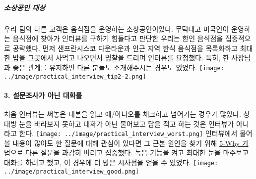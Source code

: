 \documentclass[
  letterpaper,
  DIV=11,
  numbers=noendperiod]{scrartcl}
\let\oldparagraph\paragraph
\renewcommand{\paragraph}[1]{\oldparagraph{#1}\mbox{}}
\let\oldsubparagraph\subparagraph
\renewcommand{\subparagraph}[1]{\oldsubparagraph{#1}\mbox{}}
\begin{document}
\hypertarget{uxc18cuxc0c1uxacf5uxc778-uxb300uxc0c1}{%
\subparagraph{소상공인
대상}\label{uxc18cuxc0c1uxacf5uxc778-uxb300uxc0c1}}

우리 팀의 다른 고객은 음식점을 운영하는 소상공인이었다. 무턱대고
미국인이 운영하는 음식점에 찾아가 인터뷰를 구하기 힘들다고 판단한 우리는
한인 음식점을 집중적으로 공략했다. 먼저 샌프란시스코 다운타운과 인근
지역 한식 음식점을 목록화하고 최대한 밥을 그곳에서 사먹고 나오면서
명찰을 드리며 인터뷰를 요청했다. 특히, 한 사장님과 좋은 관계를 유지하면
다른 분들도 소개해주시는 경우도 있었다.
\texttt{[image: ../image/practical\_interview\_tip2-2.png]}

\hypertarget{uxc124uxbb38uxc870uxc0acuxac00-uxc544uxb2cc-uxb300uxd654uxb97c}{%
\paragraph{3. 설문조사가 아닌
대화를}\label{uxc124uxbb38uxc870uxc0acuxac00-uxc544uxb2cc-uxb300uxd654uxb97c}}

처음 인터뷰는 써놓은 대본을 읽고 예/아니오를 체크하고 넘어가는 경우가
많았다. 상대방 눈을 바라보지 못하고 대화가 아닌 물어보고 답을 적고 하는
것은 인터뷰가 아니라고 한다.
\texttt{[image: ../image/practical\_interview\_worst.png]} 인터뷰에서
물어볼 내용이 많아도 한 질문에 대해 관심이 있다면 그 근본 원인을 찾기
위해 \href{https://brunch.co.kr/@cliche-cliche/113}{5-Why 기법}으로 다른
질문을 과감히 버리고 집중했다. 녹음 기능을 켜고 최대한 눈을 마주보고
대화를 하려고 했고, 이 경우에 더 많은 시사점을 얻을 수 있었다.
\texttt{[image: ../image/practical\_interview\_good.png]}
\end{document}
